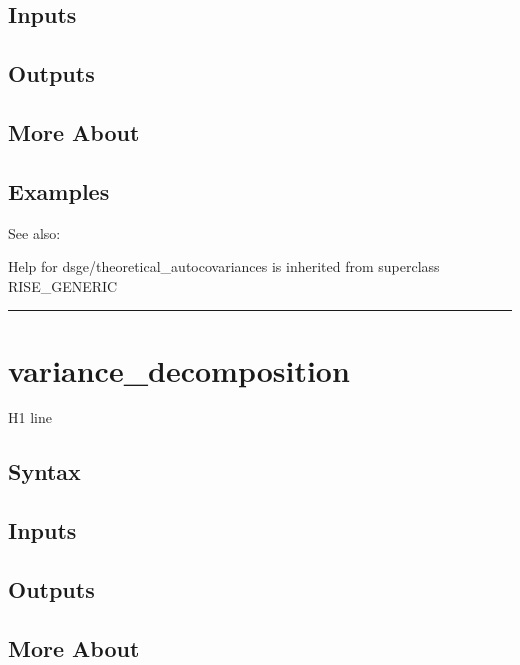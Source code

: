 \documentclass[letterpaper,10pt,english]{sphinxmanual}
\begin{document}
\subsection{Inputs}
\label{classes/models/@dsge/dsge:id235}

\subsection{Outputs}
\label{classes/models/@dsge/dsge:id236}

\subsection{More About}
\label{classes/models/@dsge/dsge:id237}

\subsection{Examples}
\label{classes/models/@dsge/dsge:id238}
See also:

Help for dsge/theoretical\_autocovariances is inherited from superclass RISE\_GENERIC


\bigskip\hrule{}\bigskip



\section{variance\_decomposition}
\label{classes/models/@dsge/dsge:variance-decomposition}\label{classes/models/@dsge/dsge:id239}
H1 line


\subsection{Syntax}
\label{classes/models/@dsge/dsge:id240}

\subsection{Inputs}
\label{classes/models/@dsge/dsge:id241}

\subsection{Outputs}
\label{classes/models/@dsge/dsge:id242}

\subsection{More About}
\label{classes/models/@dsge/dsge:id243}
\end{document}
